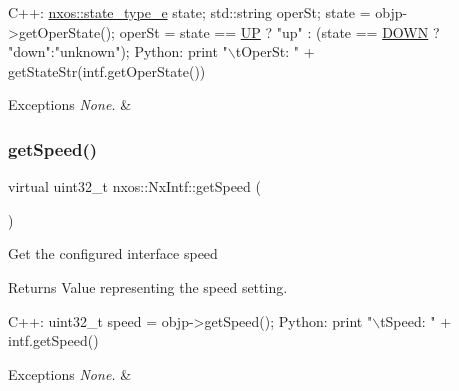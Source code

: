 \begin{DoxyCode}
C++:
    \mbox{\hyperlink{nx__common_8h_a7c257059d03188765435b36e95dbb764}{nxos::state\_type\_e}}  state;
    std::string operSt;
    state   = objp->getOperState();
    operSt = state == \mbox{\hyperlink{nx__common_8h_a7c257059d03188765435b36e95dbb764a7f57fa197f0e274e5c5d10c64d0f9436}{UP}} ? \textcolor{stringliteral}{"up"} : 
       (state == \mbox{\hyperlink{nx__common_8h_a7c257059d03188765435b36e95dbb764aa0756be42dc77ad57cf532f5c02e4c0a}{DOWN}} ? \textcolor{stringliteral}{"down"}:\textcolor{stringliteral}{"unknown"});
Python:
    print \textcolor{stringliteral}{"\(\backslash\)tOperSt: "} + getStateStr(intf.getOperState())      
\end{DoxyCode}



\begin{DoxyExceptions}{Exceptions}
{\em None.} & \\
\hline
\end{DoxyExceptions}
\mbox{\label{classnxos_1_1_nx_intf_ac1fdcdff8093c76a11b06951d2673356}} 
\subsubsection{\texorpdfstring{get\+Speed()}{getSpeed()}}
{\footnotesize\ttfamily virtual uint32\+\_\+t nxos\+::\+Nx\+Intf\+::get\+Speed (\begin{DoxyParamCaption}{ }\end{DoxyParamCaption})\hspace{0.3cm}{\ttfamily [pure virtual]}}

Get the configured interface speed ~\newline
 \begin{DoxyReturn}{Returns}
Value representing the speed setting. ~\newline

\end{DoxyReturn}

\begin{DoxyCode}
C++:
       uint32\_t speed    =  objp->getSpeed();
Python:
       print \textcolor{stringliteral}{"\(\backslash\)tSpeed: "} + intf.getSpeed()
\end{DoxyCode}



\begin{DoxyExceptions}{Exceptions}
{\em None.} & \\
\hline
\end{DoxyExceptions}
\mbox{\label{classnxos_1_1_nx_intf_aa0885ab26e4abfaa8c7e8e8adb9d32ab}} 
